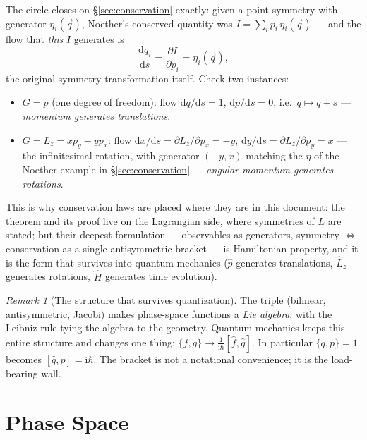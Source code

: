 \documentclass[11pt]{article}
\theoremstyle{plain}
\theoremstyle{definition}
\theoremstyle{remark}
\newtheorem{remark}[theorem]{Remark}
\newcommand{\dd}{\mathrm{d}}
\newcommand{\ii}{\mathrm{i}}
\newcommand{\pd}[2]{\frac{\partial #1}{\partial #2}}
\newcommand{\vq}{\vec{q}}
\begin{document}
The circle closes on \S\ref{sec:conservation} exactly: given a point
symmetry with generator $\eta_i(\vq)$, Noether's conserved quantity was
$I = \sum_i p_i\,\eta_i(\vq)$ --- and the flow that \emph{this} $I$
generates is
\begin{equation}
  \frac{\dd q_i}{\dd s} = \pd{I}{p_i} = \eta_i(\vq) ,
\end{equation}
the original symmetry transformation itself. Check two instances:
\begin{itemize}
  \item $G = p$ (one degree of freedom): flow
  $\dd q/\dd s = 1$, $\dd p/\dd s = 0$, i.e.\ $q \mapsto q + s$ ---
  \emph{momentum generates translations}.
  \item $G = L_z = x p_y - y p_x$: flow
  $\dd x/\dd s = \partial L_z/\partial p_x = -y$,
  $\dd y/\dd s = \partial L_z/\partial p_y = x$ --- the infinitesimal
  rotation, with generator $(-y, x)$ matching the $\eta$ of the Noether
  example in \S\ref{sec:conservation} --- \emph{angular momentum
  generates rotations}.
\end{itemize}
This is why conservation laws are placed where they are in this document:
the theorem and its proof live on the Lagrangian side, where symmetries
of $L$ are stated; but their deepest formulation --- observables as
generators, symmetry $\Leftrightarrow$ conservation as a single
antisymmetric bracket --- is Hamiltonian property, and it is the form
that survives into quantum mechanics ($\hat p$ generates translations,
$\hat L_z$ generates rotations, $\hat H$ generates time evolution).

\begin{remark}[The structure that survives quantization]
The triple (bilinear, antisymmetric, Jacobi) makes phase-space functions
a \emph{Lie algebra}, with the Leibniz rule tying the algebra to the
geometry. Quantum mechanics keeps this entire structure and changes one
thing: $\{f,g\} \to \tfrac{1}{\ii\hbar}[\hat f, \hat g]$. In particular
$\{q,p\} = 1$ becomes $[\hat q, \hat p] = \ii\hbar$. The bracket is not a
notational convenience; it is the load-bearing wall.
\end{remark}

\section{Phase Space}
\label{sec:phase-space}
\end{document}
